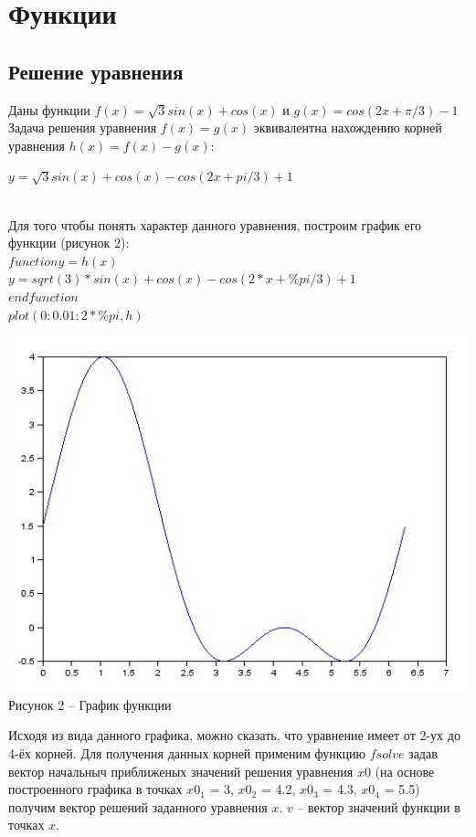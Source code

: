 \documentclass[russian, utf8, nocolumnxxxi, nocolumnxxxii, 14pt]{eskdtext}
\begin{document}
\section{Функции}
\subsection{Решение уравнения}
Даны функции $f(x) = \sqrt{3}sin(x) + cos(x)$ и $g(x) = cos(2x + \pi/3) - 1$ \\
\indent Задача решения уравнения $f(x) = g(x)$ эквивалентна нахождению корней уравнения $h(x) = f(x) - g(x)$:\\
\begin{center} $y = \sqrt{3}sin(x) + cos(x) - cos(2x + pi/3) + 1$ \end{center}\\
\indent Для того чтобы понять характер данного уравнения, построим график его функции (рисунок 2):\\
$function y = h(x)$ \\
$y = sqrt(3) * sin(x) + cos(x) - cos(2*x + \%pi/3) + 1$ \\
$endfunction$ \\
$plot(0:0.01:2*\%pi,h)$ \\
\begin{center} \includegraphics[scale=0.9]{JPG/zwei.jpg}\\
Рисунок 2 -- График функции\\
\end{center}
\indent Исходя из вида данного графика, можно сказать, что уравнение имеет от 2-ух до 4-ёх корней. Для получения данных корней применим функцию $fsolve$ задав вектор начальныч приближеных значений решения уравнения $x0$ (на основе построенного графика в точках $x0_1$ = 3, $x0_2$ = 4.2, $x0_3$ = 4.3, $x0_4$ = 5.5) получим вектор решений заданного уравнения $x$. $v$ -- вектор значений функции в точках $x$. \\
\end{document}
